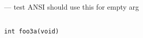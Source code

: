 \startmanpage
{}
--- test ANSI should use this for empty arg 
\startvb\begin{verbatim}

int foo3a(void)
\end{verbatim}
\endvb

\endmanpage
